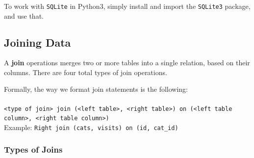 \documentclass[english, 10pt]{article}
\begin{document}
To work with \texttt{SQLite} in Python3, simply install and import the \texttt{SQLite3} package, and use that.

\subsection{Joining Data}

A \textbf{join} operations merges two or more tables into a single relation, based on their columns. There are four total types of join operations.\\ 

\begin{myproof}
Formally, the way we format join statements is the following:\\\\
\texttt{<type of join> join (<left table>, <right table>) on (<left table column>, <right table column>)}\\

Example: \texttt{Right join (cats, visits) on (id, cat\_id)}
\end{myproof}

\subsubsection{Types of Joins}
\end{document}
